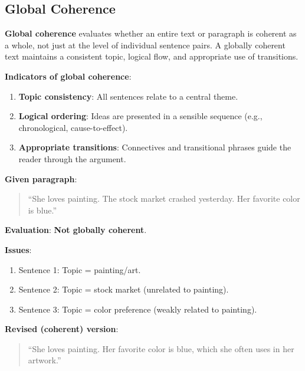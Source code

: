 \documentclass[11pt,a4paper]{article}
\begin{document}
\subsection{Global Coherence}

\textbf{Global coherence} evaluates whether an entire text or paragraph is coherent as a whole, not just at the level of individual sentence pairs. A globally coherent text maintains a consistent topic, logical flow, and appropriate use of transitions.

\textbf{Indicators of global coherence}:
\begin{enumerate}
    \item \textbf{Topic consistency}: All sentences relate to a central theme.
    \item \textbf{Logical ordering}: Ideas are presented in a sensible sequence (e.g., chronological, cause-to-effect).
    \item \textbf{Appropriate transitions}: Connectives and transitional phrases guide the reader through the argument.
\end{enumerate}

\begin{tcolorbox}[colback=green!5!white,colframe=green!75!black,title=\textbf{Worked Example: Evaluating Global Coherence}]
\textbf{Given paragraph}:
\begin{quote}
``She loves painting. The stock market crashed yesterday. Her favorite color is blue.''
\end{quote}

\textbf{Evaluation}: \textbf{Not globally coherent}.

\textbf{Issues}:
\begin{enumerate}
    \item Sentence 1: Topic = painting/art.
    \item Sentence 2: Topic = stock market (unrelated to painting).
    \item Sentence 3: Topic = color preference (weakly related to painting).
\end{enumerate}

\textbf{Revised (coherent) version}:
\begin{quote}
``She loves painting. Her favorite color is blue, which she often uses in her artwork.''
\end{quote}
\end{tcolorbox}
\end{document}
